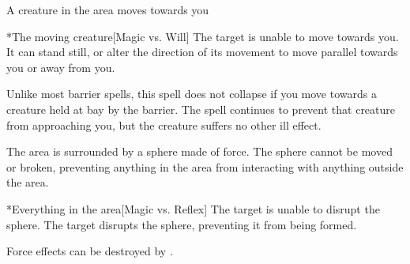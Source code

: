 \begin{spellheader}
    \spelldur{\durshort \dismissable}
\end{spellheader}
\begin{spelleffects}
    \begin{spelltrigger}{A creature in the area moves towards you}
        \begin{spelltarget}*{The moving creature}[Magic vs. Will]
            \spellsuccess The target is unable to move towards you. It can stand still, or alter the direction of its movement to move parallel towards you or away from you.
        \end{spelltarget}
    \end{spelltrigger}
\end{spelleffects}
\begin{spellfooter}
    \spellnotes Unlike most barrier spells, this spell does not collapse if you move towards a creature held at bay by the barrier. The spell continues to prevent that creature from approaching you, but the creature suffers no other ill effect.
\end{spellfooter}

\begin{spellheader}
    \spellrng{\rngmed}
    \spelldur{\durshort \dismissable}
\end{spellheader}
\begin{spelleffects}
    \spelleffect The area is surrounded by a sphere made of force. The sphere cannot be moved or broken, preventing anything in the area from interacting with anything outside the area.
    \begin{spelltarget}*{Everything in the area}[Magic vs. Reflex]
        \spellsuccess The target is unable to disrupt the sphere.
        \spellfailure The target disrupts the sphere, preventing it from being formed.
    \end{spelltarget}
\end{spelleffects}
\begin{spellfooter}
    \spellnotes Force effects can be destroyed by .
\end{spellfooter}

